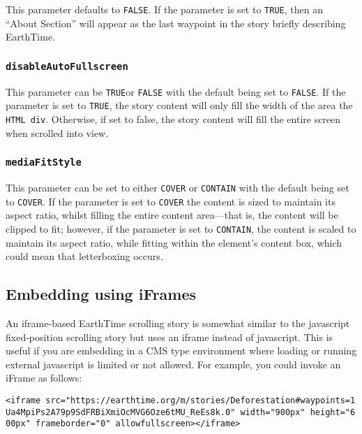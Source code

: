 \documentclass[
]{krantz}
\begin{document}
This parameter defaults to \texttt{FALSE}. If the parameter is set to \texttt{TRUE}, then an ``About Section'' will appear as the last waypoint in the story briefly describing EarthTime.

\hypertarget{disableautofullscreen}{%
\subsubsection*{\texorpdfstring{\texttt{disableAutoFullscreen}}{disableAutoFullscreen}}\label{disableautofullscreen}}


This parameter can be \texttt{TRUE}or \texttt{FALSE} with the default being set to \texttt{FALSE}. If the parameter is set to \texttt{TRUE}, the story content will only fill the width of the area the \texttt{HTML\ div}. Otherwise, if set to false, the story content will fill the entire screen when scrolled into view.

\hypertarget{mediafitstyle}{%
\subsubsection*{\texorpdfstring{\texttt{mediaFitStyle}}{mediaFitStyle}}\label{mediafitstyle}}


This parameter can be set to either \texttt{COVER} or \texttt{CONTAIN} with the default being set to \texttt{COVER}. If the parameter is set to \texttt{COVER} the content is sized to maintain its aspect ratio, whilst filling the entire content area---that is, the content will be clipped to fit; however, if the parameter is set to \texttt{CONTAIN}, the content is scaled to maintain its aspect ratio, while fitting within the element's content box, which could mean that letterboxing occurs.

\hypertarget{embedding-using-iframes}{%
\subsection*{Embedding using iFrames}\label{embedding-using-iframes}}


An iframe-based EarthTime scrolling story is somewhat similar to the javascript fixed-position scrolling story but uses an iframe instead of javascript. This is useful if you are embedding in a CMS type environment where loading or running external javascript is limited or not allowed. For example, you could invoke an iFrame as follows:

\texttt{\textless{}iframe\ src="https://earthtime.org/m/stories/Deforestation\#waypoints=1Ua4MpiPs2A79p9SdFRBiXmiOcMVG6Oze6tMU\_ReEs8k.0"\ width="900px"\ height="600px"\ frameborder="0"\ allowfullscreen\textgreater{}\textless{}/iframe\textgreater{}}
\end{document}
